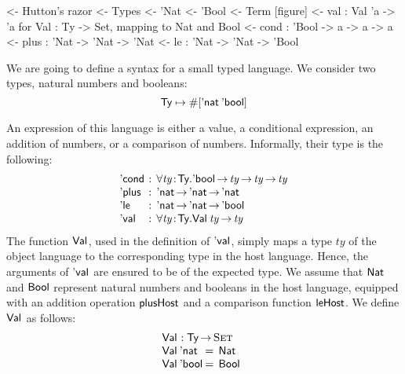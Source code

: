 \begin{wstructure}
<- Hutton's razor
    <- Types
        <- 'Nat
        <- 'Bool
    <- Term [figure]
        <- val : Val 'a -> 'a  for Val : Ty -> Set, mapping to Nat and Bool
        <- cond : 'Bool -> a -> a -> a
        <- plus : 'Nat -> 'Nat -> 'Nat
        <- le : 'Nat -> 'Nat -> 'Bool
\end{wstructure}

\newcommand{\Ty}{\C{Ty}}
\newcommand{\Ebool}{\etag{\CN{bool}}}
\newcommand{\Enat}{\etag{\CN{nat}}}

\newcommand{\Eval}[1]{\etag{\CN{val}}\:#1}
\newcommand{\Econd}[3]{\etag{\CN{cond}}\:#1\:#2\:#3}
\newcommand{\Eplus}[2]{\etag{\CN{plus}}\:#1\:#2}
\newcommand{\Ele}[2]{\etag{\CN{le}}\:#1\:#2}

\newcommand{\Val}[1]{\F{Val}\:#1}
\newcommand{\Var}[2]{\F{Var}_{#1} #2}

\newcommand{\HExprD}{\C{ExprD}}
\newcommand{\HExprAD}{\C{ExprAD}}
\newcommand{\HExprID}{\C{ExprID}}
\newcommand{\HExprVarD}[1]{\C{ExprD}_{\F{Var},#1}}
\newcommand{\HExprFreeD}{\C{ExprD}^{\C{Free}}}
\newcommand{\HExprAFreeD}{\C{ExprAD}^{\C{Free}}}

We are going to define a syntax for a small typed language. We
consider two types, natural numbers and booleans:
%
\[
\Ty \mapsto \EnumT{\sqr{\Enat\: \Ebool}}
\]

An expression of this language is either a value, a conditional
expression, an addition of numbers, or a comparison of
numbers. Informally, their type is the following:
%
\[
\begin{array}{l@{\::\:\:}l}
\Econd{\!}{\!}{\!}   & \forall \Bhab{\V{ty}}{\Ty} . \Ebool \To \V{ty} \To \V{ty} \To \V{ty}  \\ 
\Eplus{\!}{\!}       & \Enat \To \Enat \To \Enat                           \\
\Ele{\!}{\!}         & \Enat \To \Enat \To \Ebool                          \\
\Eval{\!}            & \forall \Bhab{\V{ty}}{\Ty} . \Val{\V{ty}} \To \V{ty}
\end{array}
\]
%
The function $\Val{\!}$, used in the definition of $\Eval{\!}$, simply
maps a type $ty$ of the object language to the corresponding type in
the host language. Hence, the arguments of $\Eval{\!}$ are ensured to
be of the expected type. We assume that $\Nat$ and $\Bool$ represent
natural numbers and booleans in the host language, equipped with an
addition operation $\F{plusHost}$ and a comparison function
$\F{leHost}$. We define $\Val{\!}$ as follows:
%
\[\stk{
\Val{\!} : \Ty \To \Set \\
\begin{array}{@{}l@{\:=\:\:}l}
\Val{\Enat}   & \Nat \\
\Val{\Ebool}  & \Bool
\end{array}
}\]

